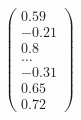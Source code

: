 \documentclass[preview]{standalone}
\begin{document}
\begin{align*}
\begin{pmatrix} 0.59 \\ -0.21 \\ 0.8 \\ \dots \\ -0.31 \\ 0.65 \\ 0.72 \end{pmatrix}
\end{align*}
\end{document}
